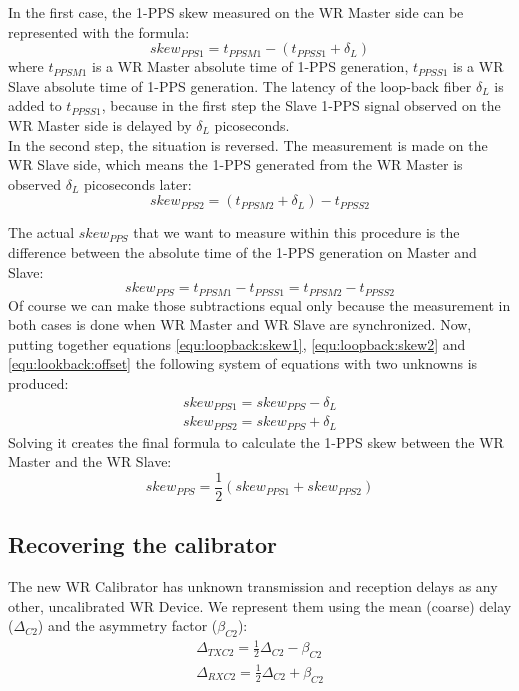 In the first case, the 1-PPS skew measured on the WR Master side can be represented
with the formula:
\begin{equation}
\label{equ:loopback:skew1}
skew_{PPS1} = t_{PPSM1} - (t_{PPSS1} + \delta_{L})
\end{equation}
where $t_{PPSM1}$ is a WR Master absolute time of 1-PPS generation, $t_{PPSS1}$
is a WR Slave absolute time of 1-PPS generation. The latency of the loop-back
fiber $\delta_{L}$ is added to $t_{PPSS1}$, because in the first step the Slave
1-PPS signal observed on the WR Master side is delayed by $\delta_{L}$
picoseconds.\\

In the second step, the situation is reversed. The measurement is made on the WR
Slave side, which means the 1-PPS generated from the WR Master is observed
$\delta_{L}$ picoseconds later:
\begin{equation}
\label{equ:loopback:skew2}
skew_{PPS2} = (t_{PPSM2} + \delta_{L}) - t_{PPSS2}
\end{equation}

The actual $skew_{PPS}$ that we want to measure within this procedure is the
difference between the absolute time of the 1-PPS generation on Master and Slave:
\begin{equation}
\label{equ:lookback:offset}
skew_{PPS} = t_{PPSM1} - t_{PPSS1} = t_{PPSM2} - t_{PPSS2}
\end{equation}
Of course we can make those subtractions equal only because the measurement in
both cases is done when WR Master and WR Slave are synchronized. Now, putting
together equations \ref{equ:loopback:skew1}, \ref{equ:loopback:skew2} and
\ref{equ:lookback:offset} the following system of equations with two unknowns is
produced:
\begin{align}
skew_{PPS1} = skew_{PPS} - \delta_{L}\\
skew_{PPS2} = skew_{PPS} + \delta_{L}
\end{align}
Solving it creates the final formula to calculate the 1-PPS skew between the WR
Master and the WR Slave:
\begin{equation}
skew_{PPS} = \frac{1}{2} (skew_{PPS1} + skew_{PPS2})
\end{equation}

\subsection{Recovering the calibrator}
The new WR Calibrator has unknown transmission and reception delays as any
other, uncalibrated WR Device. We represent them using the mean
(coarse) delay ($\Delta_{C2}$) and the asymmetry factor ($\beta_{C2}$):
\begin{align}
	\Delta_{TXC2} = \frac{1}{2}\Delta_{C2} - \beta_{C2}\\
	\Delta_{RXC2} = \frac{1}{2}\Delta_{C2} + \beta_{C2}
\end{align}

